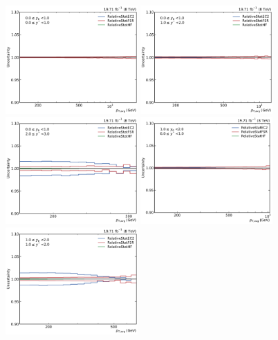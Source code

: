 \begin{figure}[htbp]
    \centering
    \includegraphics[width=0.45\textwidth]{figures/measurement/jec_relunc_4_yb0ys0.pdf}\hfill
    \includegraphics[width=0.45\textwidth]{figures/measurement/jec_relunc_4_yb0ys1.pdf}
    \includegraphics[width=0.45\textwidth]{figures/measurement/jec_relunc_4_yb0ys2.pdf}\hfill
    \includegraphics[width=0.45\textwidth]{figures/measurement/jec_relunc_4_yb1ys0.pdf}
    \includegraphics[width=0.45\textwidth]{figures/measurement/jec_relunc_4_yb1ys1.pdf}\hfill

\end{figure}

